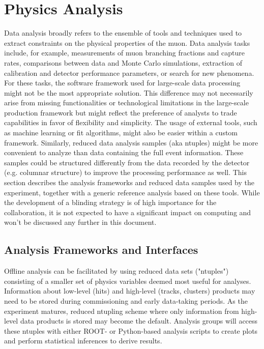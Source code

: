 \section{Physics Analysis}
\label{sec:analysis}

Data analysis broadly refers to the ensemble of tools and techniques used to extract constraints on the physical properties of the muon. Data analysis tasks include, for example, measurements of muon branching fractions and capture rates, comparisons between data and Monte Carlo simulations, extraction of calibration and detector performance parameters, or search for new phenomena. For these tasks, the software framework used for large-scale data processing might not be the most appropriate solution. This difference may not necessarily arise from missing functionalities or technological limitations in the large-scale production framework but might reflect the preference of analysts to trade capabilities in favor of flexibility and simplicity. The usage of external tools, such as machine learning or fit algorithms, might also be easier within a custom framework. Similarly, reduced data analysis samples (aka ntuples) might be more convenient to analyze than data containing the full event information. These samples could be structured differently from the data recorded by the detector (e.g. columnar structure) to improve the processing performance as well. This section describes the analysis frameworks and reduced data samples used by the experiment, together with a generic reference analysis based on these tools. While the development of a blinding strategy is of high importance for the collaboration, it is not expected to have a significant impact on computing and won't be discussed any further in this document. 




\subsection{Analysis Frameworks and Interfaces}

Offline analysis can be facilitated by using reduced data sets ("ntuples") consisting of a smaller set of physics variables deemed most useful for analyses. Information about low-level (hits) and high-level (tracks, clusters) products may need to be stored during commissioning and early data-taking periods. As the experiment matures, reduced ntupling scheme where only information from high-level data products is stored may become the default. Analysis groups will access these ntuples with either ROOT- or Python-based analysis scripts to create plots and perform statistical inferences to derive results.

